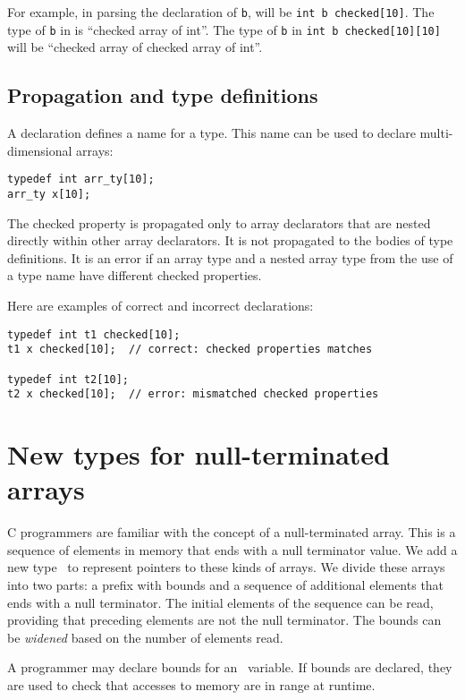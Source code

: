 For example, in parsing the declaration of \texttt{b}, 
will be \texttt{int b checked[10]}. The type of \texttt{b} in
 is ``checked array of int''. The type of \texttt{b} in
\texttt{int b checked[10][10]} will be ``checked array of
checked array of int''.

\subsection{Propagation and type definitions}

A  declaration defines a name for a type. This name
can be used to declare multi-dimensional arrays:
\begin{verbatim}
typedef int arr_ty[10];
arr_ty x[10];
\end{verbatim}
The checked property is propagated only to array declarators that are 
nested directly within other array declarators.   It is not propagated to
the bodies of type definitions.  It is an error if an array type and a nested 
array type from the use of a type name have different checked properties.

Here are examples of correct and incorrect declarations:
\begin{verbatim}
typedef int t1 checked[10];
t1 x checked[10];  // correct: checked properties matches

typedef int t2[10];
t2 x checked[10];  // error: mismatched checked properties
\end{verbatim}

\section{New types for null-terminated arrays}
\label{section:nullterm-types}

C programmers are familiar with the concept of
a null-terminated array.  This is a sequence of elements
in memory that ends with a null terminator value.  We add a new type
\ntarrayptrT\
to represent pointers to these kinds of arrays.  We divide
these arrays into two parts: a prefix with bounds and
a sequence of additional elements that ends
with a null terminator.  The initial elements of the 
sequence can be read, providing that preceding elements
are not the null terminator.  The bounds can be 
{\em widened} based on the number of elements read.

A programmer may declare bounds for an \ntarrayptr\ variable.  If bounds
are declared, they are used to check that accesses to memory are in range
at runtime.

